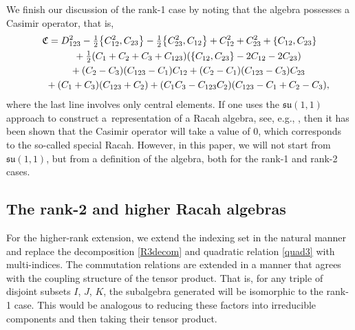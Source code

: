 \documentclass[10pt,a4paper]{amsart}
\numberwithin{equation}{section}
\begin{document}
 We finish our discussion of the rank-1 case by noting that the algebra possesses a Casimir operator, that is,
\begin{gather}
\mathfrak{C}= D_{123}^2-\tfrac{1}{2}\big\lbrace C_{12}^2,C_{23}\big\rbrace-\tfrac{1}{2}\big\lbrace C_{23}^2,C_{12}\big\rbrace+C_{12}^2+C_{23}^2+\lbrace C_{12},C_{23}\rbrace\nonumber\\
\hphantom{\mathfrak{C}=}{}+\tfrac{1}{2}(C_1+C_2+C_3+C_{123})(\lbrace C_{12},C_{23}\rbrace-2C_{12}-2C_{23})\nonumber\\
\hphantom{\mathfrak{C}=}{}+(C_2-C_3)(C_{123}-C_1)C_{12}+(C_2-C_1)(C_{123}-C_3)C_{23}\nonumber\\
\hphantom{\mathfrak{C}=}{}+(C_1+C_3)(C_{123}+C_2)+(C_1C_3-C_{123}C_2)(C_{123}-C_1+C_2-C_3),\label{Casmir1}
\end{gather}
where the last line involves only central elements. If one uses the $\mathfrak{su}(1,1)$ approach to construct a~representation of a Racah algebra, see, e.g., \cite{GVZ2013}, then it has been shown that the Casimir operator will take a value of 0, which corresponds to the so-called special Racah. However, in this paper, we will not start from $\mathfrak{su}(1,1)$, but from a definition of the algebra, both for the rank-1 and rank-2 cases.





\subsection{The rank-2 and higher Racah algebras}

For the higher-rank extension, we extend the indexing set in the natural manner and replace the decomposition \eqref{R3decom} and quadratic relation \eqref{quad3} with multi-indices. The commutation relations are extended in a manner that agrees with the coupling structure of the tensor product. That is, for any triple of disjoint subsets $I$, $J$, $K$, the subalgebra generated will be isomorphic to the rank-1 case. This would be analogous to reducing these factors into irreducible components and then taking their tensor product.
\end{document}
